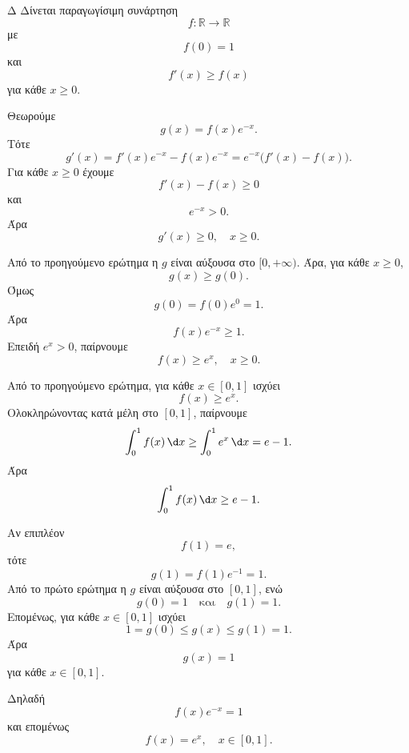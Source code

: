 \begin{thema}{Δ}
Δίνεται παραγωγίσιμη συνάρτηση
\[
f:\mathbb{R}\to\mathbb{R}
\]
με
\[
f(0)=1
\]
και
\[
f'(x)\geq f(x)
\]
για κάθε $x\geq0$.
\begin{erwthma}
\item Θεωρούμε
\[
g(x)=f(x)e^{-x}.
\]
Τότε
\[
g'(x)=f'(x)e^{-x}-f(x)e^{-x}
=e^{-x}\bigl(f'(x)-f(x)\bigr).
\]
Για κάθε $x\geq0$ έχουμε
\[
f'(x)-f(x)\geq0
\]
και
\[
e^{-x}>0.
\]
Άρα
\[
{g'(x)\geq0,\quad x\geq0}.
\]

\item Από το προηγούμενο ερώτημα η $g$ είναι αύξουσα στο $[0,+\infty)$.
Άρα, για κάθε $x\geq0$,
\[
g(x)\geq g(0).
\]
Όμως
\[
g(0)=f(0)e^0=1.
\]
Άρα
\[
f(x)e^{-x}\geq1.
\]
Επειδή $e^x>0$, παίρνουμε
\[
{f(x)\geq e^x,\quad x\geq0}.
\]

\item Από το προηγούμενο ερώτημα, για κάθε $x\in[0,1]$ ισχύει
\[
f(x)\geq e^x.
\]
Ολοκληρώνοντας κατά μέλη στο $[0,1]$, παίρνουμε
\[
\dint_0^1 f(x)\,\d x
\geq
\dint_0^1 e^x\,\d x
=e-1.
\]
Άρα
\[
{\dint_0^1 f(x)\,\d x\geq e-1}.
\]

\item Αν επιπλέον
\[
f(1)=e,
\]
τότε
\[
g(1)=f(1)e^{-1}=1.
\]
Από το πρώτο ερώτημα η $g$ είναι αύξουσα στο $[0,1]$, ενώ
\[
g(0)=1
\quad\text{και}\quad
g(1)=1.
\]
Επομένως, για κάθε $x\in[0,1]$ ισχύει
\[
1=g(0)\leq g(x)\leq g(1)=1.
\]
Άρα
\[
g(x)=1
\]
για κάθε $x\in[0,1]$.

Δηλαδή
\[
f(x)e^{-x}=1
\]
και επομένως
\[
{f(x)=e^x,\quad x\in[0,1]}.
\]
\end{erwthma}
\end{thema}
